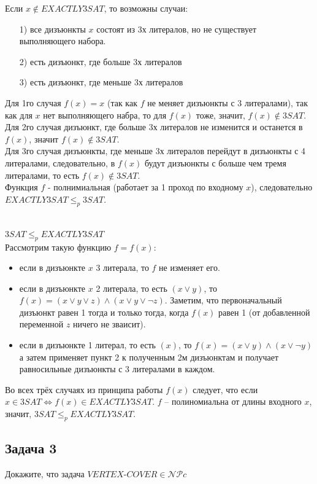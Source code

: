 \documentclass[a4paper,12pt]{article} %
\begin{document}
Если $ x \notin EXACTLY3SAT $, то возможны случаи: 
\begin{itemize}
\item[1)] все дизъюнкты $ x $ состоят из 3х литералов, но не существует выполняющего набора.
\item[2)] есть дизъюнкт, где больше 3х литералов
\item[3)] есть дизъюнкт, где меньше 3х литералов
\end{itemize}
Для 1го случая $ f(x)=x $ (так как $ f $ не меняет дизъюнкты с 3 литералами), так как для $ x $ нет выполняющего набра, то для $ f(x) $ тоже, значит, $ f(x) \notin 3SAT $.\\
Для 2го случая дизъюнкт, где больше 3х литералов не изменится и останется в $ f(x) $, значит $ f(x) \notin 3SAT$.\\
Для 3го случая дизъюнкты, где меньше 3х литералов перейдут в дизъюнкты с 4 литералами, следовательно, в $ f(x) $ будут дизъюнкты с больше чем тремя литералами, то есть $ f(x) \notin 3SAT $.\\

Функция $ f $ - полнимиальная (работает за 1 проход по входному $ x $), следовательно $EXACTLY3SAT \leq_p 3SAT$.\\
\\
\\
{\bf $3SAT \leq_p EXACTLY3SAT$}\\
Рассмотрим такую функцию $ f = f(x) $:
\begin{itemize}
\item если в дизъюнкте $ x $ 3 литерала, то $ f $ не изменяет его.
\item если в дизъюнкте $ x $ 2 литерала, то есть $(x \vee y)$, то $ f(x) = (x \vee y \vee z) \wedge (x \vee y \vee \neg z) $. Заметим, что первоначальный дизъюнкт равен 1 тогда и только тогда, когда $ f(x) $ равен 1 (от добавленной переменной $ z $ ничего не зваисит).
\item если в дизъюнкте 1 литерал, то есть $(x)$, то $ f(x) = (x \vee y) \wedge (x \vee \neg y) $ а затем применяет пункт 2 к полученным 2м дизъюнктам и получает равносильные дизъюнкты с 3 литералами в каждом.
\end{itemize}
Во всех трёх случаях из принципа работы $ f(x) $ следует, что если $ x\in 3SAT \Leftrightarrow f(x)\in EXACTLY3SAT $. $ f $ -- полиномиальна от длины входного $ x $, значит, $3SAT \leq_p EXACTLY3SAT$.


\subsection*{Задача 3}
Докажите, что задача $VERTEX$-$COVER \in \mathcal{NP}c$\\
\end{document}
